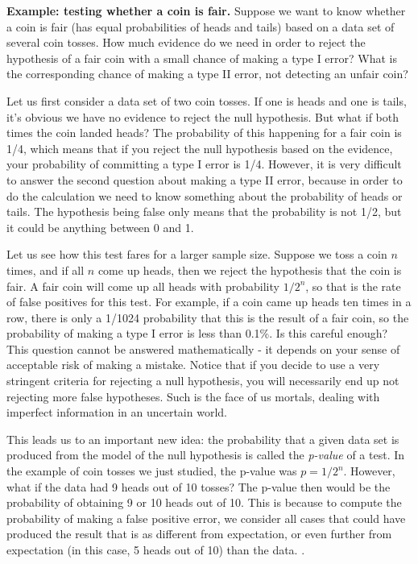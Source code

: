 \documentclass[
  letterpaper,
  DIV=11,
  numbers=noendperiod]{scrreprt}
\begin{document}
\textbf{Example: testing whether a coin is fair.} Suppose we want to
know whether a coin is fair (has equal probabilities of heads and tails)
based on a data set of several coin tosses. How much evidence do we need
in order to reject the hypothesis of a fair coin with a small chance of
making a type I error? What is the corresponding chance of making a type
II error, not detecting an unfair coin?

Let us first consider a data set of two coin tosses. If one is heads and
one is tails, it's obvious we have no evidence to reject the null
hypothesis. But what if both times the coin landed heads? The
probability of this happening for a fair coin is 1/4, which means that
if you reject the null hypothesis based on the evidence, your
probability of committing a type I error is 1/4. However, it is very
difficult to answer the second question about making a type II error,
because in order to do the calculation we need to know something about
the probability of heads or tails. The hypothesis being false only means
that the probability is not 1/2, but it could be anything between 0 and
1.

Let us see how this test fares for a larger sample size. Suppose we toss
a coin \(n\) times, and if all \(n\) come up heads, then we reject the
hypothesis that the coin is fair. A fair coin will come up all heads
with probability \(1/2^n\), so that is the rate of false positives for
this test. For example, if a coin came up heads ten times in a row,
there is only a 1/1024 probability that this is the result of a fair
coin, so the probability of making a type I error is less than 0.1\%. Is
this careful enough? This question cannot be answered mathematically -
it depends on your sense of acceptable risk of making a mistake. Notice
that if you decide to use a very stringent criteria for rejecting a null
hypothesis, you will necessarily end up not rejecting more false
hypotheses. Such is the face of us mortals, dealing with imperfect
information in an uncertain world.

This leads us to an important new idea: the probability that a given
data set is produced from the model of the null hypothesis is called the
\emph{p-value} of a test. In the example of coin tosses we just studied,
the p-value was \(p=1/2^n\). However, what if the data had 9 heads out
of 10 tosses? The p-value then would be the probability of obtaining 9
or 10 heads out of 10. This is because to compute the probability of
making a false positive error, we consider all cases that could have
produced the result that is as different from expectation, or even
further from expectation (in this case, 5 heads out of 10) than the
data. \cite{whitlock_analysis_2008}.
\end{document}
